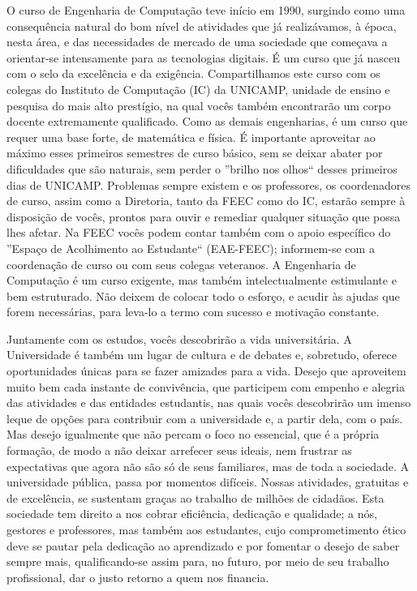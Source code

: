 O curso de Engenharia de Computação teve início em 1990, surgindo como uma
consequência natural do bom nível de atividades que já realizávamos, à época,
nesta área, e das necessidades de mercado de uma sociedade que começava a
orientar-se intensamente para as tecnologias digitais. É um curso que já nasceu
com o selo da excelência e da exigência. Compartilhamos este curso com os
colegas do Instituto de Computação (IC) da UNICAMP, unidade de ensino e
pesquisa do mais alto prestígio, na qual vocês também encontrarão um corpo
docente extremamente qualificado. Como as demais engenharias, é um curso que
requer uma base forte, de matemática e física. É importante aproveitar ao
máximo esses primeiros semestres de curso básico, sem se deixar abater por
dificuldades que são naturais, sem perder o ''brilho nos olhos`` desses
primeiros dias de UNICAMP. Problemas sempre existem e os professores, os
coordenadores de curso, assim como a Diretoria, tanto da FEEC como do IC,
estarão sempre à disposição de vocês, prontos para ouvir e remediar qualquer
situação que possa lhes afetar. Na FEEC vocês podem contar também com o apoio
específico do ''Espaço de Acolhimento ao Estudante`` (EAE-FEEC); informem-se
com a coordenação de curso ou com seus colegas veteranos. A Engenharia de
Computação é um curso exigente, mas também intelectualmente estimulante e bem
estruturado. Não deixem de colocar todo o esforço, e acudir às ajudas que forem
necessárias, para leva-lo a termo com sucesso e motivação constante.

Juntamente com os estudos, vocês descobrirão a vida universitária. A
Universidade é também um lugar de cultura e de debates e, sobretudo, oferece
oportunidades únicas para se fazer amizades para a vida. Desejo que aproveitem
muito bem cada instante de convivência, que participem com empenho e alegria
das atividades e das entidades estudantis, nas quais vocês descobrirão um
imenso leque de opções para contribuir com a universidade e, a partir dela, com
o país. Mas desejo igualmente que não percam o foco no essencial, que é a
própria formação, de modo a não deixar arrefecer seus ideais, nem frustrar as
expectativas que agora não são só de seus familiares, mas de toda a sociedade.
A universidade pública, passa por momentos difíceis. Nossas atividades,
gratuitas e de excelência, se sustentam graças ao trabalho de milhões de
cidadãos. Esta sociedade tem direito a nos cobrar eficiência, dedicação e
qualidade; a nós, gestores e professores, mas também aos estudantes, cujo
comprometimento ético deve se pautar pela dedicação ao aprendizado e por
fomentar o desejo de saber sempre mais, qualificando-se assim para, no futuro,
por meio de seu trabalho profissional, dar o justo retorno a quem nos financia.

